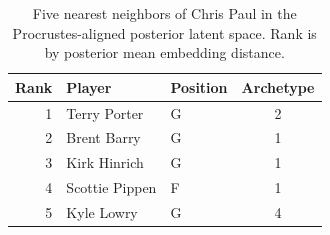 \begin{table}[htbp]
  \centering\small
  \begin{tabular}{rllc}
    \toprule
    Rank & Player & Position & Archetype \\
    \midrule
    1 & Terry Porter & G & 2 \\
    2 & Brent Barry & G & 1 \\
    3 & Kirk Hinrich & G & 1 \\
    4 & Scottie Pippen & F & 1 \\
    5 & Kyle Lowry & G & 4 \\
    \bottomrule
  \end{tabular}
  \caption{Five nearest neighbors of Chris Paul in the Procrustes-aligned posterior latent space. Rank is by posterior mean embedding distance.}
  \label{tab:Chris_Paul_neighbors}
\end{table}

